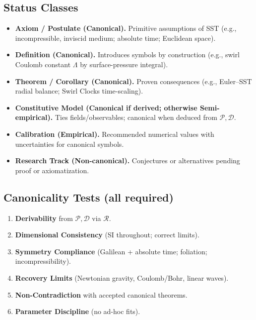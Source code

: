 \documentclass[11pt]{article}
\begin{document}
    \subsection*{Status Classes}
    \begin{itemize}
        \item \textbf{Axiom / Postulate (Canonical).} Primitive assumptions of SST (e.g., incompressible, inviscid medium; absolute time; Euclidean space).
        \item \textbf{Definition (Canonical).} Introduces symbols by construction (e.g., swirl Coulomb constant \(\Lambda\) by surface-pressure integral).
        \item \textbf{Theorem / Corollary (Canonical).} Proven consequences (e.g., Euler–SST radial balance; Swirl Clocks time-scaling).
        \item \textbf{Constitutive Model (Canonical if derived; otherwise Semi-empirical).} Ties fields/observables; canonical when deduced from \(\mathcal{P},\mathcal{D}\).
        \item \textbf{Calibration (Empirical).} Recommended numerical values with uncertainties for canonical symbols.
        \item \textbf{Research Track (Non-canonical).} Conjectures or alternatives pending proof or axiomatization.
    \end{itemize}

    \subsection*{Canonicality Tests (all required)}
    \begin{enumerate}
        \item \textbf{Derivability} from \(\mathcal{P},\mathcal{D}\) via \(\mathcal{R}\).
        \item \textbf{Dimensional Consistency} (SI throughout; correct limits).
        \item \textbf{Symmetry Compliance} (Galilean + absolute time; foliation; incompressibility).
        \item \textbf{Recovery Limits} (Newtonian gravity, Coulomb/Bohr, linear waves).
        \item \textbf{Non-Contradiction} with accepted canonical theorems.
        \item \textbf{Parameter Discipline} (no ad-hoc fits).
    \end{enumerate}
\end{document}
